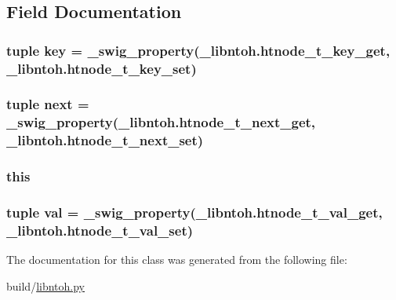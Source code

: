 \subsection{Field Documentation}
\hypertarget{classlibntoh_1_1htnode__t_a29eb8dd921f77e19e24a20bcd820c2ed}{
\subsubsection[{key}]{\setlength{\rightskip}{0pt plus 5cm}tuple key = {\bf \-\_\-swig\-\_\-property}(\-\_\-libntoh.\-htnode\-\_\-t\-\_\-key\-\_\-get, \-\_\-libntoh.\-htnode\-\_\-t\-\_\-key\-\_\-set)\hspace{0.3cm}{\ttfamily [static]}}}\label{classlibntoh_1_1htnode__t_a29eb8dd921f77e19e24a20bcd820c2ed}
\hypertarget{classlibntoh_1_1htnode__t_a84e6dac37062f5a539ece8248c8567cc}{
\subsubsection[{next}]{\setlength{\rightskip}{0pt plus 5cm}tuple next = {\bf \-\_\-swig\-\_\-property}(\-\_\-libntoh.\-htnode\-\_\-t\-\_\-next\-\_\-get, \-\_\-libntoh.\-htnode\-\_\-t\-\_\-next\-\_\-set)\hspace{0.3cm}{\ttfamily [static]}}}\label{classlibntoh_1_1htnode__t_a84e6dac37062f5a539ece8248c8567cc}
\hypertarget{classlibntoh_1_1htnode__t_a05c09a5e9d53fa7adf0a7936038c2fa3}{
\subsubsection[{this}]{\setlength{\rightskip}{0pt plus 5cm}this}}\label{classlibntoh_1_1htnode__t_a05c09a5e9d53fa7adf0a7936038c2fa3}
\hypertarget{classlibntoh_1_1htnode__t_a8ac4b8dab696ef786dcf547bf611c388}{
\subsubsection[{val}]{\setlength{\rightskip}{0pt plus 5cm}tuple val = {\bf \-\_\-swig\-\_\-property}(\-\_\-libntoh.\-htnode\-\_\-t\-\_\-val\-\_\-get, \-\_\-libntoh.\-htnode\-\_\-t\-\_\-val\-\_\-set)\hspace{0.3cm}{\ttfamily [static]}}}\label{classlibntoh_1_1htnode__t_a8ac4b8dab696ef786dcf547bf611c388}


The documentation for this class was generated from the following file\-:\begin{DoxyCompactItemize}
\item 
build/\hyperlink{libntoh_8py}{libntoh.\-py}\end{DoxyCompactItemize}
